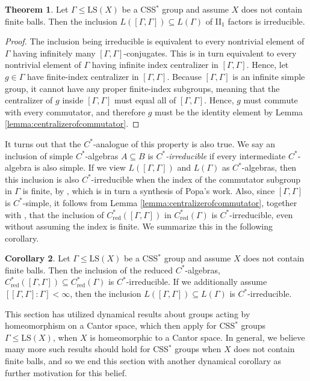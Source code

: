 \documentclass[12pt]{amsart}
\numberwithin{equation}{subsection}
\theoremstyle{definition}
\newtheorem{theorem}{Theorem}[section]
\newtheorem{corollary}[theorem]{Corollary}
\theoremstyle{definition}
\theoremstyle{remark}
\begin{document}
\begin{theorem}
Let $\Gamma \le \text{LS}(X)$ be a CSS$^*$ group and assume $X$ does not contain finite balls. Then the inclusion $L([\Gamma , \Gamma ]) \subseteq L(\Gamma)$ of II$_1$ factors is irreducible. 
\end{theorem}
\begin{proof}
The inclusion being irreducible is equivalent to every nontrivial element of $\Gamma$ having infinitely many $[\Gamma , \Gamma ]$-conjugates. This is in turn equivalent to every nontrivial element of $\Gamma$ having infinite index centralizer in $[\Gamma , \Gamma ]$. Hence, let $g \in \Gamma$ have finite-index centralizer in $[\Gamma , \Gamma ]$. Because $[\Gamma , \Gamma ]$ is an infinite simple group, it cannot have any proper finite-index subgroups, meaning that the centralizer of $g$ inside $[\Gamma , \Gamma ]$ must equal all of $[\Gamma , \Gamma ]$. Hence, $g$ must commute with every commutator, and therefore $g$ must be the identity element by Lemma \ref{lemma:centralizerofcommutator}.
\end{proof}

It turns out that the $C^*$-analogue of this property is also true. We say an inclusion of simple $C^*$-algebras $A \subseteq B$ is \emph{$C^*$-irreducible} if every intermediate $C^*$-algebra is also simple. If we view $L([\Gamma, \Gamma])$ and $L(\Gamma)$ as $C^*$-algebras, then this inclusion is also $C^*$-irreducible when the index of the commutator subgroup in $\Gamma$ is finite, by \cite[Theorem 4.4]{rordam2023irreducible}, which is in turn a synthesis of Popa's work. Also, since $[\Gamma, \Gamma]$ is $C^*$-simple, it follows from Lemma \ref{lemma:centralizerofcommutator}, together with \cite[Theorem 6.4]{bedos2023c}, that the inclusion of  $C^*_{\text{red}}([\Gamma, \Gamma])$ in  $C^*_{\text{red}}(\Gamma)$ is $C^*$-irreducible, even without assuming the index is finite. We summarize this in the following corollary. 

\begin{corollary}
    Let $\Gamma \le \text{LS}(X)$ be a CSS$^*$ group and assume $X$ does not contain finite balls. Then the inclusion of the reduced $C^*$-algebras, $C^*_{\text{red}}([\Gamma, \Gamma]) \subseteq C^*_{\text{red}}(\Gamma)$ is $C^*$-irreducible. If we additionally assume $[[\Gamma, \Gamma] : \Gamma] < \infty$, then the inclusion $L([\Gamma, \Gamma]) \subseteq L(\Gamma)$ is $C^*$-irreducible.
\end{corollary}

This section has utilized dynamical results about groups acting by homeomorphism on a Cantor space, which then apply for CSS$^*$ groups $\Gamma \leq \text{LS}(X)$, when $X$ is homeomorphic to a Cantor space. In general, we believe many more such results should hold for CSS$^*$ groups when $X$ does not contain finite balls, and so we end this section with another dynamical corollary as further motivation for this belief. 
\end{document}
